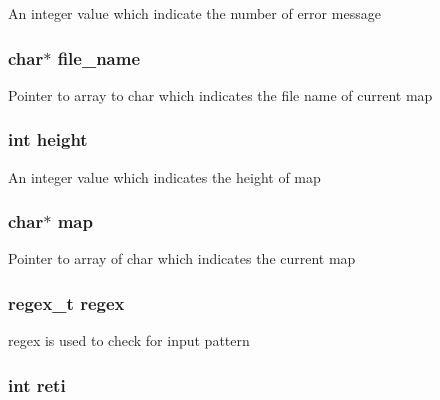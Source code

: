 An integer value which indicate the number of error message \hypertarget{pacman-level-editor_8c_a8505c513bc640d1f69e5f76fb32b24a8}{
\subsubsection[{file\-\_\-name}]{\setlength{\rightskip}{0pt plus 5cm}char$\ast$ file\-\_\-name}}\label{pacman-level-editor_8c_a8505c513bc640d1f69e5f76fb32b24a8}
Pointer to array to char which indicates the file name of current map \hypertarget{pacman-level-editor_8c_ad12fc34ce789bce6c8a05d8a17138534}{
\subsubsection[{height}]{\setlength{\rightskip}{0pt plus 5cm}int height}}\label{pacman-level-editor_8c_ad12fc34ce789bce6c8a05d8a17138534}
An integer value which indicates the height of map \hypertarget{pacman-level-editor_8c_a7b00b1bfd666e26484471bd17a74eaa9}{
\subsubsection[{map}]{\setlength{\rightskip}{0pt plus 5cm}char$\ast$ map}}\label{pacman-level-editor_8c_a7b00b1bfd666e26484471bd17a74eaa9}
Pointer to array of char which indicates the current map \hypertarget{pacman-level-editor_8c_a0f8fc8b8cd2ff33a04952c702504ccf4}{
\subsubsection[{regex}]{\setlength{\rightskip}{0pt plus 5cm}regex\-\_\-t regex}}\label{pacman-level-editor_8c_a0f8fc8b8cd2ff33a04952c702504ccf4}
regex is used to check for input pattern \hypertarget{pacman-level-editor_8c_aefa902538b1cd5840102ccc807fe3f37}{
\subsubsection[{reti}]{\setlength{\rightskip}{0pt plus 5cm}int reti}}\label{pacman-level-editor_8c_aefa902538b1cd5840102ccc807fe3f37}
